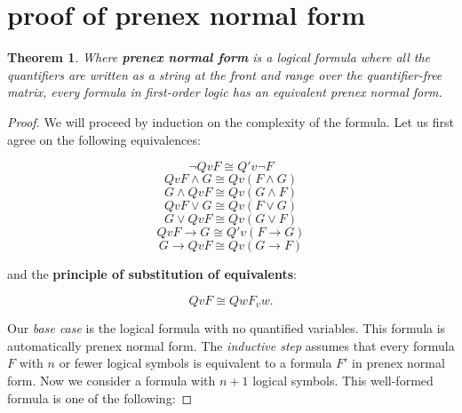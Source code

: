 \documentclass[a4paper,11pt]{article}
\newtheorem{thm}{Theorem}[section]
\begin{document}
\setcounter{equation}{0}

	
\section{proof of prenex normal form}

\begin{thm} Where \textbf{prenex normal form} is a logical formula where all the quantifiers are written as a string at the front and range over the quantifier-free matrix, every formula in first-order logic has an equivalent prenex normal form. \end{thm}

	
	\begin{proof}
		We will proceed by induction on the complexity of the formula. 
		Let us first agree on the following equivalences:
		
		\begin{equation} \lnot Qv F \cong Q'v \lnot F \end{equation}
		\begin{equation} Qv F \land G \cong Qv(F \land G) \end{equation}
		\begin{equation} G \land Qv F \cong Qv(G \land F) \end{equation}	
		\begin{equation} Qv F \lor G \cong Qv(F \lor G) \end{equation}
		\begin{equation} G \lor Qv F \cong Qv(G \lor F) \end{equation}
		\begin{equation} Qv F  \rightarrow G \cong Q'v(F \rightarrow G) \end{equation}
		\begin{equation} G \rightarrow Qv F \cong Qv(G \rightarrow F) \end{equation}
		
		\bigskip
		
		and the \textbf{principle of substitution of equivalents}:
		
		\begin{equation} Qv F \cong Qw F_{v} w. \end{equation}
		
		\bigskip
		
		Our \textit{base case} is the logical formula with no quantified variables. This formula
		is automatically prenex normal form. The \textit{inductive step} assumes that every formula $F$
		with $n$ or fewer logical symbols is equivalent to a formula $F'$ in prenex normal form. 
		Now we consider a formula with $n + 1$ logical symbols. This well-formed formula is
		one of the following:
		

\end{proof}
\end{document}
